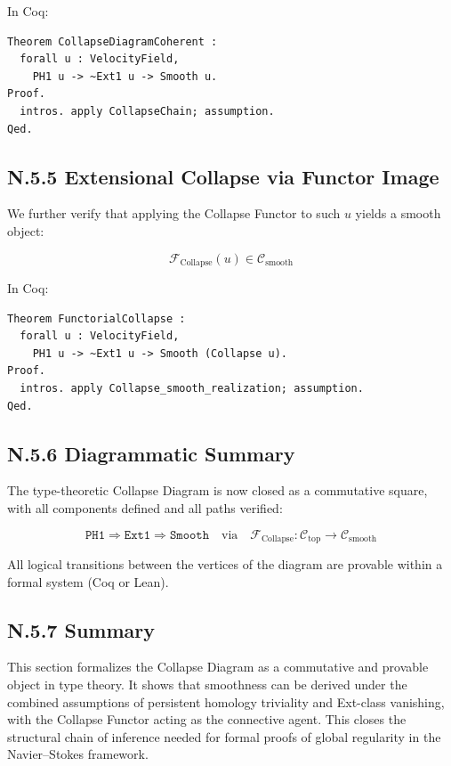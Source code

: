 \documentclass[11pt]{article}
\begin{document}
In Coq:

\begin{verbatim}
Theorem CollapseDiagramCoherent :
  forall u : VelocityField,
    PH1 u -> ~Ext1 u -> Smooth u.
Proof.
  intros. apply CollapseChain; assumption.
Qed.
\end{verbatim}

\subsection*{N.5.5 Extensional Collapse via Functor Image}

We further verify that applying the Collapse Functor to such $u$ yields a smooth object:

\[
\mathcal{F}_{\mathrm{Collapse}}(u) \in \mathcal{C}_{\mathrm{smooth}}
\]

In Coq:

\begin{verbatim}
Theorem FunctorialCollapse :
  forall u : VelocityField,
    PH1 u -> ~Ext1 u -> Smooth (Collapse u).
Proof.
  intros. apply Collapse_smooth_realization; assumption.
Qed.
\end{verbatim}

\subsection*{N.5.6 Diagrammatic Summary}

The type-theoretic Collapse Diagram is now closed as a commutative square, with all components defined and all paths verified:

\[
\texttt{PH1} \Rightarrow \texttt{Ext1} \Rightarrow \texttt{Smooth}
\quad \text{via}\quad
\mathcal{F}_{\mathrm{Collapse}} : \mathcal{C}_{\mathrm{top}} \to \mathcal{C}_{\mathrm{smooth}}
\]

All logical transitions between the vertices of the diagram are provable within a formal system (Coq or Lean).

\subsection*{N.5.7 Summary}

This section formalizes the Collapse Diagram as a commutative and provable object in type theory.  
It shows that smoothness can be derived under the combined assumptions of persistent homology triviality  
and Ext-class vanishing, with the Collapse Functor acting as the connective agent. This closes the structural  
chain of inference needed for formal proofs of global regularity in the Navier–Stokes framework.
\end{document}
